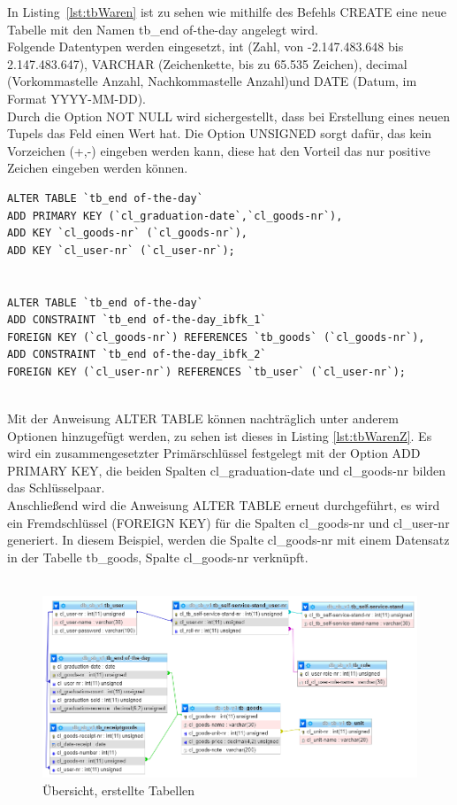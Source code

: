 In Listing~\ref{lst:tbWaren} ist zu sehen wie mithilfe des Befehls CREATE eine neue Tabelle mit den Namen tb\_end of-the-day angelegt wird. 
\\
Folgende Datentypen werden eingesetzt, int (Zahl, von -2.147.483.648 bis 2.147.483.647), VARCHAR (Zeichenkette, bis zu 65.535 Zeichen), decimal (Vorkommastelle Anzahl, Nachkommastelle Anzahl)und DATE (Datum, im Format YYYY-MM-DD).
\\
Durch die Option NOT NULL wird sichergestellt, dass bei Erstellung eines neuen Tupels das Feld einen Wert hat.
Die Option UNSIGNED sorgt dafür, das kein Vorzeichen (+,-) eingeben werden kann, diese hat den Vorteil das nur positive Zeichen eingeben werden können.



\lstset{language=SQL}
\begin{lstlisting}[frame=htrbl, caption={Veränderung der Tabelle tb\_receiptgoods mit Hilfe des SQL-Behelfes ALTER}, label={lst:tbWarenZ}]
ALTER TABLE `tb_end of-the-day`
ADD PRIMARY KEY (`cl_graduation-date`,`cl_goods-nr`),
ADD KEY `cl_goods-nr` (`cl_goods-nr`),
ADD KEY `cl_user-nr` (`cl_user-nr`);


ALTER TABLE `tb_end of-the-day`
ADD CONSTRAINT `tb_end of-the-day_ibfk_1` 
FOREIGN KEY (`cl_goods-nr`) REFERENCES `tb_goods` (`cl_goods-nr`),
ADD CONSTRAINT `tb_end of-the-day_ibfk_2` 
FOREIGN KEY (`cl_user-nr`) REFERENCES `tb_user` (`cl_user-nr`);
			
\end{lstlisting}	


Mit der Anweisung ALTER TABLE können nachträglich unter anderem Optionen hinzugefügt werden, zu sehen ist dieses in Listing \ref{lst:tbWarenZ}. Es wird ein zusammengesetzter Primärschlüssel festgelegt mit der Option ADD PRIMARY KEY, die beiden Spalten cl\_graduation-date und cl\_goods-nr bilden das Schlüsselpaar.
\\
Anschließend wird die Anweisung ALTER TABLE erneut durchgeführt, es wird ein Fremdschlüssel (FOREIGN KEY) für die Spalten cl\_goods-nr und cl\_user-nr generiert. 
In diesem Beispiel, werden die Spalte cl\_goods-nr mit einem Datensatz in der Tabelle tb\_goods, Spalte cl\_goods-nr verknüpft.
\\
\\
\newpage

\begin{figure}[htb]
	\centering
	\includegraphics[width=1\textwidth,angle=0]{abb/erstellteTabellen}
	\caption[Übersicht, erstellte Tabellen]{Übersicht, erstellte Tabellen}
	\label{fig:erstellteTabellen}
\end{figure}

